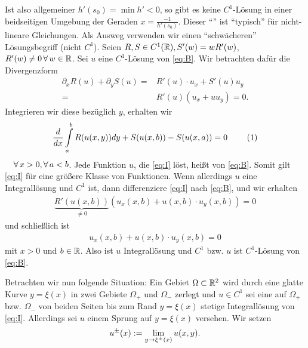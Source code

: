 \begin{bsp}
  Ist also allgemeiner $h'(s_0)=\min h'<0$, so gibt es keine $C^1$-Lösung in einer beidseitigen Umgebung der Geraden $x=\frac{-1}{h'(s_0)}$. Dieser "`"' ist "`typisch"' für nicht-lineare Gleichungen.
  Als Ausweg verwenden wir einen "`schwächeren"' Lösungsbegriff (nicht $C^1$). Seien $R,S\in C^1(\mathbb{R}),S'(w)=wR'(w)$, $R'(w)\neq0\, \forall\,  w\in\mathbb{R}$. Sei $u$ eine $C^1$-Lösung von \eqref{eq:B}. Wir betrachten dafür die Divergenzform
  \begin{align*}
    \partial_xR(u)+\partial_yS(u)=&R'(u)\cdot u_x+S'(u)u_y \\
    =& R'(u)(u_x+uu_y)=0.
  \end{align*}
  Integrieren wir diese bezüglich $y$, erhalten wir
  \[ \diff x
  \int\limits_a^bR(u(x,y))dy+S(u(x,b))-S(u(x,a))=0\eq{eq:I}
  \]
  $\quad\forall\, x>0,\forall\, a<b$. Jede Funktion $u$, die \eqref{eq:I} löst, heißt  von \eqref{eq:B}. Somit gilt \eqref{eq:I} für eine größere Klasse von Funktionen. Wenn allerdings $u$ eine Integrallösung und $C^1$ ist, dann differenziere \eqref{eq:I} nach \eqref{eq:B}, und wir erhalten
  \begin{align*}
    \underbrace{R'(u(x,b))}_{\neq 0}(u_x(x,b)+u(x,b)\cdot u_y(x,b))=0
    \end{align*}
    {und schließlich ist}
    \begin{align*}
    u_x(x,b)+u(x,b)\cdot u_y(x,b)=0
  \end{align*}
  mit $x>0$ und $b\in\mathbb{R}$. Also ist $u$ Integrallösung und $C^1$ bzw. $u$ ist $C^1$-Lösung von \eqref{eq:B}.
\end{bsp}

Betrachten wir nun folgende Situation: Ein Gebiet $\Omega\subset\mathbb{R}^2$ wird durch eine glatte Kurve $y=\xi(x)$ in zwei Gebiete $\Omega_+$ und $\Omega_-$ zerlegt und $u\in C^1$ sei eine auf $\Omega_+$ bzw. $\Omega_-$ von beiden Seiten bis zum Rand $y=\xi(x)$ stetige Integrallösung von \eqref{eq:I}. Allerdings sei $u$ einem Sprung auf $y=\xi(x)$ versehen. Wir setzen
\[ u^\pm(x):=\lim_{y\rightarrow\xi^\pm(x)}u(x,y). \]

